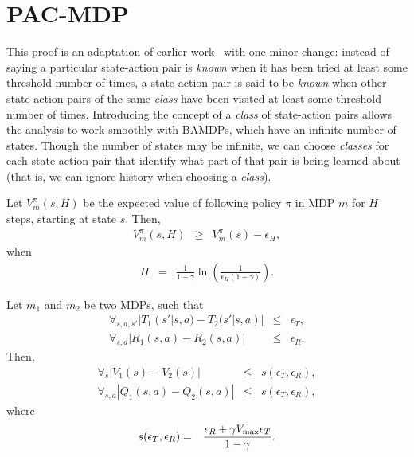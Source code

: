 \section{PAC-MDP}


\newcommand{\A}{$\mathbf{A}$\ }
\newcommand{\As}{$\mathbf{A}$'s\ }

This proof is an adaptation of earlier work~\cite{lihong09pacmdp,kearns02} with one minor change: instead of saying a particular state-action pair is \emph{known} when it has been tried at least some threshold number of times, a state-action pair is said to be \emph{known} when other state-action pairs of the same \emph{class} have been visited at least some threshold number of times. Introducing the concept of a \emph{class} of state-action pairs allows the analysis to work smoothly with BAMDPs, which have an infinite number of states. Though the number of states may be infinite, we can choose \emph{classes} for each state-action pair that identify what part of that pair is being learned about (that is, we can ignore history when choosing a \emph{class}).

\begin{lemma}

\label{sec:pacmdp:horizon-error}
Let $V^\pi_m(s,H)$ be the expected value of following policy $\pi$ in MDP $m$ for $H$ steps, starting at state $s$. Then,
\begin{eqnarray}
V^\pi_m(s,H) &\geq& V^\pi_m(s) - \epsilon_H,
\end{eqnarray}
when
\begin{eqnarray}
H&=&\frac 1 {1-\gamma} \ln\left(\frac 1 {\epsilon_H (1-\gamma)}\right).
\end{eqnarray}
\end{lemma}

\begin{lemma}

\label{sec:pacmdp:simulation}
Let $m_1$ and $m_2$ be two MDPs, such that
\begin{eqnarray}
\forall_{s,a,s'} |T_1(s'|s,a) - T_2(s'|s,a)| &\leq& \epsilon_T,\\
\forall_{s,a} |R_1(s,a) - R_2(s,a)| &\leq& \epsilon_R.
\end{eqnarray}
Then,
\begin{eqnarray}
\forall_s |V_1(s) - V_2(s)| &\leq& s(\epsilon_T,\epsilon_R),\\
\forall_{s,a} |Q_1(s,a) - Q_2(s,a)| &\leq& s(\epsilon_T,\epsilon_R),
\end{eqnarray}
where
\begin{eqnarray}
s(\epsilon_T,\epsilon_R) &=& \frac {\epsilon_R + \gamma V_{\rm max} \epsilon_T} {1-\gamma}.
\end{eqnarray}
\end{lemma}

